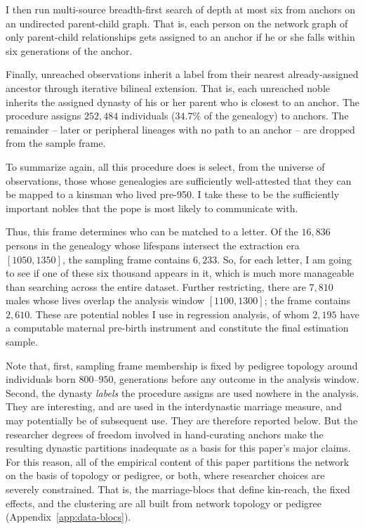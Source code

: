 \documentclass[12pt]{article}
\theoremstyle{definition}
\theoremstyle{remark}
\begin{document}
I then run multi-source breadth-first search of depth at most six from anchors on an undirected parent-child graph. That is, each person on the network graph of only parent-child relationships gets assigned to an anchor if he or she falls within six generations of the anchor.

Finally, unreached observations inherit a label from their nearest already-assigned ancestor through iterative bilineal extension. That is, each unreached noble inherits the assigned dynasty of his or her parent who is closest to an anchor. The procedure assigns $252{,}484$ individuals ($34.7\%$ of the genealogy) to anchors. The remainder -- later or peripheral lineages with no path to an anchor -- are dropped from the sample frame.

To summarize again, all this procedure does is select, from the universe of observations, those whose genealogies are sufficiently well-attested that they can be mapped to a kinsman who lived pre-950. I take these to be the sufficiently important nobles that the pope is most likely to communicate with.

Thus, this frame determines who can be matched to a letter. Of the $16{,}836$ persons in the genealogy whose lifespans intersect the extraction era $[1050,1350]$, the sampling frame contains $6{,}233$. So, for each letter, I am going to see if one of these six thousand appears in it, which is much more manageable than searching across the entire dataset. Further restricting, there are $7{,}810$ males whose lives overlap the analysis window $[1100,1300]$; the frame contains $2{,}610$. These are potential nobles I use in regression analysis, of whom $2{,}195$ have a computable maternal pre-birth instrument and constitute the final estimation sample.

Note that, first, sampling frame membership is fixed by pedigree topology around individuals born $800$--$950$, generations before any outcome in the analysis window. Second, the dynasty \emph{labels} the procedure assigns are used nowhere in the analysis. They are interesting, and are used in the interdynastic marriage measure, and may potentially be of subsequent use. They are therefore reported below. But the researcher degrees of freedom involved in hand-curating anchors make the resulting dynastic partitions inadequate as a basis for this paper's major claims. For this reason, all of the empirical content of this paper partitions the network on the basis of topology or pedigree, or both, where researcher choices are severely constrained. That is, the marriage-blocs that define kin-reach, the fixed effects, and the clustering are all built from network topology or pedigree (Appendix~\ref{app:data-blocs}).
\end{document}
